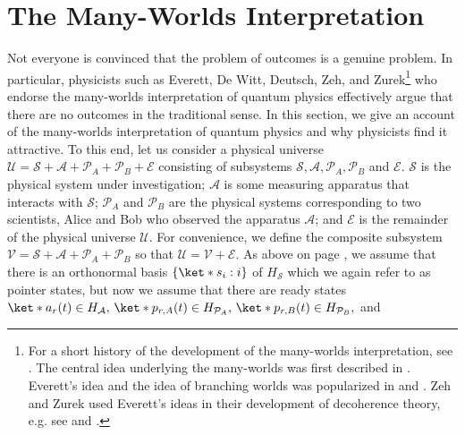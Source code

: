 \documentclass[12pt]{report}
\begin{document}
 
    \section{The Many-Worlds Interpretation}\label{manyworldsinterpretation1}
    Not everyone is convinced that the problem of outcomes is a genuine problem. In particular, physicists such as Everett, De Witt, Deutsch, Zeh, and Zurek\footnote{For a short history of the development of the many-worlds interpretation, see \cite[336--337]{Schlosshauer}. The central idea underlying the many-worlds was first described in \cite{EverettHugh1957RSFo}. Everett's idea and the idea of branching worlds was popularized in \cite{DeWittBryceS.1970Qmar} and \cite{DEUTSCHD1985Qtaa}. Zeh and Zurek used Everett's ideas in their development of decoherence theory, e.g. see \cite{ZehH.D.1993Tanq} and \cite{ZurekWojciechH.1998Deat}.} who endorse the many-worlds interpretation of quantum physics effectively argue that there are no outcomes in the traditional sense. In this section, we give an account of the many-worlds interpretation of quantum physics and why physicists find it attractive. To this end, let us consider a physical universe $\mathcal{U}=\mathcal{S}+\mathcal{A}+\mathcal{P}_A+\mathcal{P}_B+\mathcal{E}$ consisting of subsystems $\mathcal{S}, \mathcal{A}, \mathcal{P}_A,\mathcal{P}_B$  %
%
    and $\mathcal{E}$. $\mathcal{S}$ is the physical system under investigation; $\mathcal{A}$ is some measuring apparatus that interacts with $\mathcal{S}$; $\mathcal{P}_A$ and $\mathcal{P}_B$ are the physical systems corresponding to two scientists, Alice and Bob who observed the apparatus $\mathcal{A}$; and $\mathcal{E}$ is the remainder of the physical universe $\mathcal{U}$.  For convenience, we define the composite subsystem $\mathcal{V}=\mathcal{S}+\mathcal{A}+\mathcal{P}_A+\mathcal{P}_B$ %
%
    so that $\mathcal{U}=\mathcal{V}+\mathcal{E}$. As above on page \pageref{pointer}, we  assume that there is an orthonormal basis $\{\ket*{s_i}:i\}$ of $H_\mathcal{S}$ which we again refer to as pointer states, but now we assume that there are ready states $\ket*{a_r(t)}\in H_\mathcal{A},\,\ket*{p_{r, A}(t)}\in H_{\mathcal{P}_A},\,\ket*{p_{r, B}(t)}\in H_{\mathcal{P}_B},$ and  %
\end{document}
